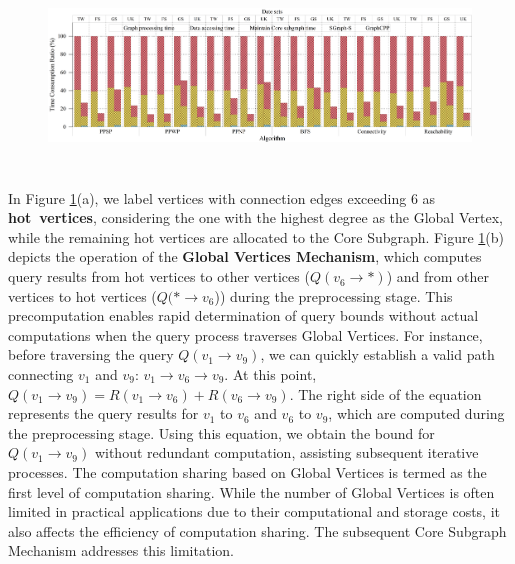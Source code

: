 \documentclass[10pt,journal,compsoc]{IEEEtran}
\begin{document}
\begin{figure}[t]
    \centering
    \includegraphics[width=7.0in, height=1.98in]{picture/Zhang-fig7.png}
    \captionsetup{labelsep=period}
    \caption{}
    \label{fig7}
\end{figure}

In Figure \ref{fig7}(a), we label vertices with connection edges exceeding 6 as {\bf{hot~vertices}}, considering the one with the highest degree as the Global Vertex, while the remaining hot vertices are allocated to the Core Subgraph.
Figure \ref{fig7}(b) depicts the operation of the {\bf{Global Vertices Mechanism}}, which computes query results from hot vertices to other vertices ($Q(v_6\rightarrow *)$) and from other vertices to hot vertices ($Q(*\rightarrow v_6$)) during the preprocessing stage.
This precomputation enables rapid determination of query bounds without actual computations when the query process traverses Global Vertices. For instance, before traversing the query $Q(v_1\rightarrow v_9)$, we can quickly establish a valid path connecting $v_1$ and $v_9$: $v_1\rightarrow v_6\rightarrow v_9$. At this point, $Q(v_1\rightarrow v_9) = R(v_1\rightarrow v_6) + R(v_6\rightarrow v_9)$. 
The right side of the equation represents the query results for $v_1$ to $v_6$ and $v_6$ to $v_9$, which are computed during the preprocessing stage. Using this equation, we obtain the bound for $Q(v_1\rightarrow v_9)$ without redundant computation, assisting subsequent iterative processes.
The computation sharing based on Global Vertices is termed as the first level of computation sharing. While the number of Global Vertices is often limited in practical applications due to their computational and storage costs, it also affects the efficiency of computation sharing. The subsequent Core Subgraph Mechanism addresses this limitation.
\end{document}

